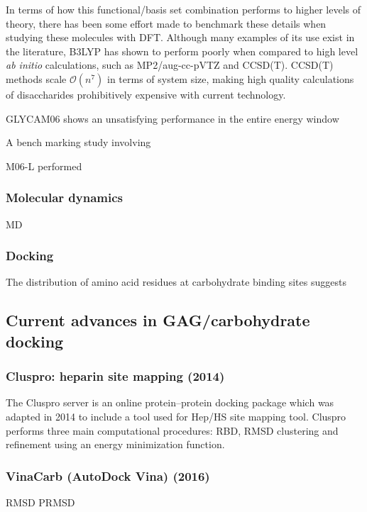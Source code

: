 \documentclass[journal=jctcce,manuscript=article]{achemso}
\begin{document}
{In terms of how this functional/basis set combination performs to higher levels of theory, there has been some effort made to benchmark these details when studying these molecules with \ac{DFT}. Although many examples of its use exist in the literature, B3LYP has shown to perform poorly when compared to high level \textit{ab initio} calculations, such as MP2/aug-cc-pVTZ and CCSD(T). CCSD(T) methods scale $\mathcal{O}(n^{7})$ in terms of system size, making high quality calculations of disaccharides prohibitively expensive with current technology. 

GLYCAM06 shows an unsatisfying performance in the entire energy window

A bench marking study involving 

M06-L performed 

\subsubsection{Molecular dynamics}
\Ac{MD}

\subsubsection{Docking}



The distribution of amino acid residues at carbohydrate binding sites suggests

\subsection{Current advances in GAG/carbohydrate docking}

\subsubsection{Cluspro: heparin site mapping (2014)}

The Cluspro server is an online protein--protein docking package which was adapted in 2014 to include a tool used for \ac{Hep}/\ac{HS} site mapping tool.\cite{Comeau2007ClusPro:Server, Mottarella2014DockingProteins,Kozakov2017TheDocking.} 
Cluspro performs three main computational procedures: \ac{RBD}, \ac{RMSD} clustering and refinement using an energy minimization function.\cite{Kozakov2017TheDocking.} 


\subsubsection{VinaCarb (AutoDock Vina) (2016)}
\ac{RMSD}
\ac{PRMSD}

}
\end{document}
